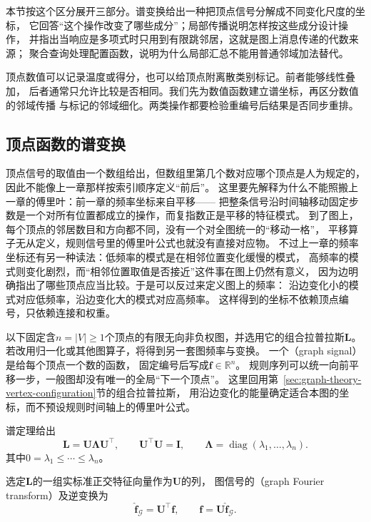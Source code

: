 本节按这个区分展开三部分。谱变换给出一种把顶点信号分解成不同变化尺度的坐标，
它回答“这个操作改变了哪些成分”；局部传播说明怎样按这些成分设计操作，
并指出当响应是多项式时只用到有限跳邻居，这就是图上消息传递的代数来源；
聚合查询处理配置函数，说明为什么局部汇总不能用普通邻域加法替代。

\label{sec:graph-theory-vertex-functions}
\label{sec:graph-theory-structure-comparison}

顶点数值可以记录温度或得分，也可以给顶点附离散类别标记。前者能够线性叠加，
后者通常只允许比较是否相同。我们先为数值函数建立谱坐标，再区分数值的邻域传播
与标记的邻域细化。两类操作都要检验重编号后结果是否同步重排。

\subsection{顶点函数的谱变换}
\label{sec:signal-analysis-graph-state-kernels}

顶点信号的取值由一个数组给出，但数组里第几个数对应哪个顶点是人为规定的，
因此不能像上一章那样按索引顺序定义“前后”。
这里要先解释为什么不能照搬上一章的傅里叶：前一章的频率坐标来自平移——
把整条信号沿时间轴移动固定步数是一个对所有位置都成立的操作，而复指数正是平移的特征模式。
到了图上，每个顶点的邻居数目和方向都不同，没有一个对全图统一的“移动一格”，
平移算子无从定义，规则信号里的傅里叶公式也就没有直接对应物。
不过上一章的频率坐标还有另一种读法：低频率的模式是在相邻位置变化缓慢的模式，
高频率的模式则变化剧烈，而“相邻位置取值是否接近”这件事在图上仍然有意义，
因为边明确指出了哪些顶点应当比较。于是可以反过来定义图上的频率：
沿边变化小的模式对应低频率，沿边变化大的模式对应高频率。
这样得到的坐标不依赖顶点编号，只依赖连接和权重。

以下固定含\(n=|V|\geq1\)个顶点的有限无向非负权图，并选用它的组合拉普拉斯\(\bm L\)。
若改用归一化或其他图算子，将得到另一套图频率与变换。
一个（graph signal）是给每个顶点一个数的函数，
固定编号后写成\(\bm f\in\mathbb R^n\)。
规则序列可以统一向前平移一步，一般图却没有唯一的全局“下一个顶点”。
这里回用第~\ref{sec:graph-theory-vertex-configuration}节的组合拉普拉斯，
用沿边变化的能量确定适合本图的坐标，而不预设规则时间轴上的傅里叶公式。

谱定理给出
\[
  \bm L=\bm U\bm\Lambda\bm U^\top,\qquad
  \bm U^\top\bm U=\bm I,\qquad
  \bm\Lambda=\operatorname{diag}(\lambda_1,\ldots,\lambda_n).
\]
其中\(0=\lambda_1\leq\cdots\leq\lambda_n\)。
\begin{definition}[图傅里叶变换]
  \label{def:signal-analysis-graph-fourier-transform}
  选定\(\bm L\)的一组实标准正交特征向量作为\(\bm U\)的列，
  图信号的（graph Fourier transform）及逆变换为
  \begin{equation}
    \widehat{\bm f}_{\mathcal G}=\bm U^\top\bm f,\qquad
    \bm f=\bm U\widehat{\bm f}_{\mathcal G}.
    \label{eq:signal-analysis-graph-fourier}
  \end{equation}
\end{definition}

